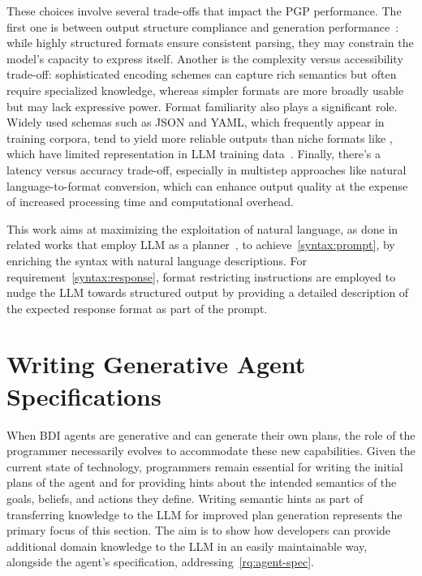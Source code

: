 \documentclass[12pt,a4paper,openright,twoside]{book}
\begin{document}
These choices involve several trade-offs that impact the PGP performance.
%
The first one is between output structure compliance and generation performance~\cite{tamLetMeSpeak2024}: while highly structured formats ensure consistent parsing, they may constrain the model's capacity to express itself.
%
Another is the complexity versus accessibility trade-off: sophisticated encoding schemes can capture rich semantics but often require specialized knowledge, whereas simpler formats are more broadly usable but may lack expressive power.
%
Format familiarity also plays a significant role. Widely used schemas such as JSON and YAML, which frequently appear in training corpora, tend to yield more reliable outputs than niche formats like \agentspeak{}, which have limited representation in LLM training data~\cite{yangStructEvalBenchmarkingLLMs2025, longLLMsAreBiased2025}.
%
Finally, there's a latency versus accuracy trade-off, especially in multistep approaches like natural language-to-format conversion, which can enhance output quality at the expense of increased processing time and computational overhead.

This work aims at maximizing the exploitation of natural language, as done in related works that employ \acs{LLM} as a planner~\cite{Murugesan25a}, to achieve~\ref{syntax:prompt}, by enriching the \agentspeak{} syntax with natural language descriptions.
%
For requirement~\ref{syntax:response}, format restricting instructions are employed to nudge the LLM towards structured output by providing a detailed description of the expected response format as part of the prompt.

\section{Writing Generative Agent Specifications}\label{sec:writing-generative-agent-specs}

When \ac{BDI} agents are generative and can generate their own plans, the role of the programmer necessarily evolves to accommodate these new capabilities. 
%
Given the current state of technology, programmers remain essential for writing the initial plans of the agent and for providing hints about the intended semantics of the goals, beliefs, and actions they define.
%
Writing semantic hints as part of transferring knowledge to the \ac{LLM} for improved plan generation represents the primary focus of this section.
%
The aim is to show how developers can provide additional domain knowledge to the \ac{LLM} in an easily maintainable way, alongside the agent's specification, addressing~\cref{rq:agent-spec}.
\end{document}
